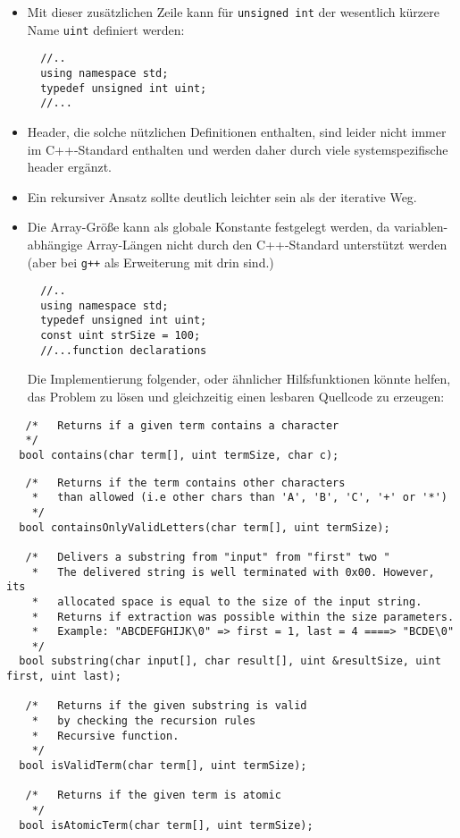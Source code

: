 \documentclass[paper=A4, pagesize, DIV=calc, smallheadings,
fontsize=11pt, expansion=false]{scrreprt}
\begin{document}
  \begin{itemize}
    \item
  Mit dieser zusätzlichen Zeile kann für \texttt{unsigned int} der wesentlich kürzere Name \texttt{uint} definiert werden:
\begin{verbatim}
  //..
  using namespace std;
  typedef unsigned int uint;
  //...
\end{verbatim}
\item
  Header, die solche nützlichen Definitionen enthalten, sind leider nicht immer im C++-Standard enthalten und werden daher durch viele systemspezifische header ergänzt.\\  
\item
  Ein rekursiver Ansatz sollte deutlich leichter sein als der iterative Weg.
\item Die Array-Größe kann als globale Konstante festgelegt werden, da variablen-abhängige Array-Längen nicht durch den C++-Standard unterstützt werden (aber bei \texttt{g++} als Erweiterung mit drin sind.)
\begin{verbatim}
  //..
  using namespace std;
  typedef unsigned int uint;
  const uint strSize = 100;  
  //...function declarations
\end{verbatim}
  Die Implementierung folgender, oder ähnlicher Hilfsfunktionen könnte helfen, das Problem zu lösen und gleichzeitig einen lesbaren Quellcode zu erzeugen:
\end{itemize}
\begin{verbatim}
   /*   Returns if a given term contains a character
   */
  bool contains(char term[], uint termSize, char c);
\end{verbatim}
\newpage
\begin{verbatim}
   /*   Returns if the term contains other characters 
    *   than allowed (i.e other chars than 'A', 'B', 'C', '+' or '*')
    */
  bool containsOnlyValidLetters(char term[], uint termSize);

   /*   Delivers a substring from "input" from "first" two "
    *   The delivered string is well terminated with 0x00. However, its 
    *   allocated space is equal to the size of the input string.
    *   Returns if extraction was possible within the size parameters.
    *   Example: "ABCDEFGHIJK\0" => first = 1, last = 4 ====> "BCDE\0"
    */
  bool substring(char input[], char result[], uint &resultSize, uint first, uint last);

   /*   Returns if the given substring is valid 
    *   by checking the recursion rules
    *   Recursive function.
    */
  bool isValidTerm(char term[], uint termSize);

   /*   Returns if the given term is atomic
    */
  bool isAtomicTerm(char term[], uint termSize);
\end{verbatim}
\end{document}
